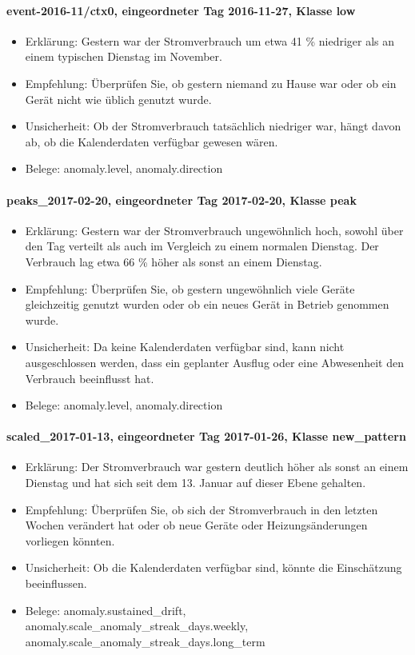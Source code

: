 \paragraph{event-2016-11/ctx0, eingeordneter Tag 2016-11-27, Klasse low}
\begin{itemize}
\item Erklärung: Gestern war der Stromverbrauch um etwa 41 \% niedriger als an einem typischen Dienstag im November.
\item Empfehlung: Überprüfen Sie, ob gestern niemand zu Hause war oder ob ein Gerät nicht wie üblich genutzt wurde.
\item Unsicherheit: Ob der Stromverbrauch tatsächlich niedriger war, hängt davon ab, ob die Kalenderdaten verfügbar gewesen wären.
\item Belege: anomaly.level, anomaly.direction
\end{itemize}

\paragraph{peaks\_\allowbreak{}2017-02-20, eingeordneter Tag 2017-02-20, Klasse peak}
\begin{itemize}
\item Erklärung: Gestern war der Stromverbrauch ungewöhnlich hoch, sowohl über den Tag verteilt als auch im Vergleich zu einem normalen Dienstag. Der Verbrauch lag etwa 66 \% höher als sonst an einem Dienstag.
\item Empfehlung: Überprüfen Sie, ob gestern ungewöhnlich viele Geräte gleichzeitig genutzt wurden oder ob ein neues Gerät in Betrieb genommen wurde.
\item Unsicherheit: Da keine Kalenderdaten verfügbar sind, kann nicht ausgeschlossen werden, dass ein geplanter Ausflug oder eine Abwesenheit den Verbrauch beeinflusst hat.
\item Belege: anomaly.level, anomaly.direction
\end{itemize}

\paragraph{scaled\_\allowbreak{}2017-01-13, eingeordneter Tag 2017-01-26, Klasse new\_\allowbreak{}pattern}
\begin{itemize}
\item Erklärung: Der Stromverbrauch war gestern deutlich höher als sonst an einem Dienstag und hat sich seit dem 13. Januar auf dieser Ebene gehalten.
\item Empfehlung: Überprüfen Sie, ob sich der Stromverbrauch in den letzten Wochen verändert hat oder ob neue Geräte oder Heizungsänderungen vorliegen könnten.
\item Unsicherheit: Ob die Kalenderdaten verfügbar sind, könnte die Einschätzung beeinflussen.
\item Belege: anomaly.sustained\_\allowbreak{}drift, anomaly.scale\_\allowbreak{}anomaly\_\allowbreak{}streak\_\allowbreak{}days.weekly, anomaly.scale\_\allowbreak{}anomaly\_\allowbreak{}streak\_\allowbreak{}days.long\_\allowbreak{}term
\end{itemize}

